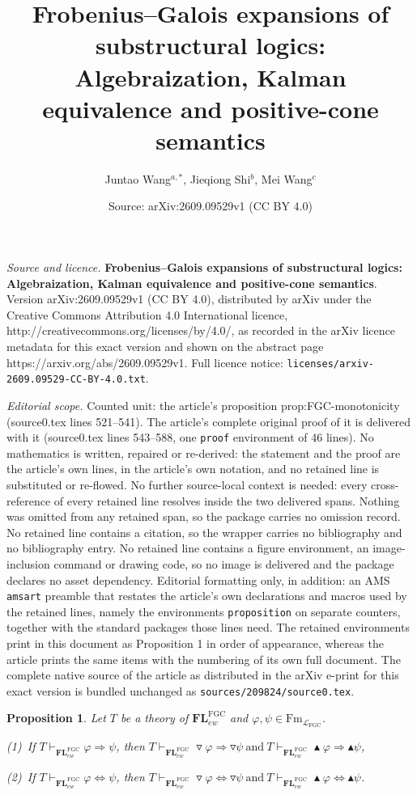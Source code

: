\documentclass[10pt,a4paper]{amsart}
\title{\textbf{Frobenius–Galois expansions of substructural logics: Algebraization, Kalman equivalence and positive-cone semantics}}
\author{Juntao Wang$^{a, *}$, Jieqiong Shi$^{b}$, Mei Wang$^{c}$}
\date{Source: arXiv:2609.09529v1 (CC BY 4.0)}
\newtheorem{proposition}{Proposition}
\begin{document}
\maketitle

\noindent\emph{Source and licence.} \textbf{Frobenius–Galois expansions of substructural logics: Algebraization, Kalman equivalence and positive-cone semantics}. Version arXiv:2609.09529v1 (CC BY 4.0), distributed by arXiv under the Creative Commons Attribution 4.0 International licence, http://creativecommons.org/licenses/by/4.0/, as recorded in the arXiv licence metadata for this exact version and shown on the abstract page https://arxiv.org/abs/2609.09529v1. Full licence notice: \texttt{licenses/arxiv-2609.09529-CC-BY-4.0.txt}.\par\smallskip

\noindent\textit{Editorial scope.} Counted unit: the article's proposition prop:FGC-monotonicity (source0.tex lines 521--541). The article's complete original proof of it is delivered with it (source0.tex lines 543--588, one \texttt{proof} environment of 46 lines). No mathematics is written, repaired or re-derived: the statement and the proof are the article's own lines, in the article's own notation, and no retained line is substituted or re-flowed.  No further source-local context is needed: every cross-reference of every retained line resolves inside the two delivered spans.  Nothing was omitted from any retained span, so the package carries no omission record.  No retained line contains a citation, so the wrapper carries no bibliography and no bibliography entry.  No retained line contains a figure environment, an image-inclusion command or drawing code, so no image is delivered and the package declares no asset dependency.  Editorial formatting only, in addition: an AMS \texttt{amsart} preamble that restates the article's own declarations and macros used by the retained lines, namely the environments \texttt{proposition} on separate counters, together with the standard packages those lines need.  The retained environments print in this document as Proposition 1 in order of appearance, whereas the article prints the same items with the numbering of its own full document.  The complete native source of the article as distributed in the arXiv e-print for this exact version is bundled unchanged as \texttt{sources/209824/source0.tex}.
\begin{proposition}\label{prop:FGC-monotonicity}
Let $T$ be a theory of $\mathbf{FL}^{\mathrm{FGC}}_{ew}$ and
$\varphi,\psi\in\mathrm{Fm}_{\mathcal L_{\mathrm{FGC}}}$.

 (1)~If
 $T\vdash_{\mathbf{FL}^{\mathrm{FGC}}_{ew}}\varphi\Rightarrow\psi$, then
 $T\vdash_{\mathbf{FL}^{\mathrm{FGC}}_{ew}}
   \triangledown\varphi\Rightarrow\triangledown\psi
 ~\text{and}~
 T\vdash_{\mathbf{FL}^{\mathrm{FGC}}_{ew}}
   \blacktriangle\varphi\Rightarrow\blacktriangle\psi$,
 
 
 (2)~If
 $T\vdash_{\mathbf{FL}^{\mathrm{FGC}}_{ew}}
   \varphi\Leftrightarrow\psi$, then $T\vdash_{\mathbf{FL}^{\mathrm{FGC}}_{ew}}
   \triangledown\varphi\Leftrightarrow\triangledown\psi
 ~\text{and}~
 T\vdash_{\mathbf{FL}^{\mathrm{FGC}}_{ew}}
   \blacktriangle\varphi\Leftrightarrow\blacktriangle\psi$.
\end{proposition}
\end{document}
